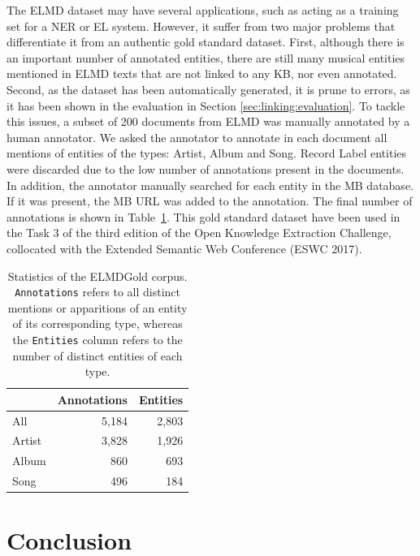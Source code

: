 The \textsc{ELMD} dataset may have several applications, such as acting as a training set for a NER or EL system. However, it suffer from two major problems that differentiate it from an authentic gold standard dataset. First, although there is an important number of annotated entities, there are still many musical entities mentioned in \textsc{ELMD} texts that are not linked to any KB, nor even annotated. Second, as the dataset has been automatically generated, it is prune to errors, as it has been shown in the evaluation in Section \ref{sec:linking:evaluation}. To tackle this issues, a subset of 200 documents from \textsc{ELMD} was manually annotated by a human annotator. We asked the annotator to annotate in each document all mentions of entities of the types: Artist, Album and Song. Record Label entities were discarded due to the low number of annotations present in the documents. In addition, the annotator manually searched for each entity in the MB database. If it was present, the MB URL was added to the annotation. The final number of annotations is shown in Table~\ref{tbl:linking:ELMDGold}.
This gold standard dataset have been used in the Task 3 of the third edition of the Open Knowledge Extraction Challenge, collocated with the Extended Semantic Web Conference (ESWC 2017)\cite{}.

\begin{table}[]
\centering
\begin{tabular}{| l| r |r |}
\hline
& \textbf{Annotations} & \textbf{Entities} \\ \hline
All    & 5,184      & 2,803    \\ \hline
Artist & 3,828      & 1,926    \\ \hline
Album  & 860       & 693    \\ \hline
Song  & 496        & 184     \\ \hline
\end{tabular}
\caption{Statistics of the ELMDGold corpus. \texttt{Annotations} refers to all distinct mentions or apparitions of an entity of its corresponding type, whereas the \texttt{Entities} column refers to the number of distinct entities of each type.}
\label{tbl:linking:ELMDGold}
\end{table}


\section{Conclusion}
\label{sec:elmd}

